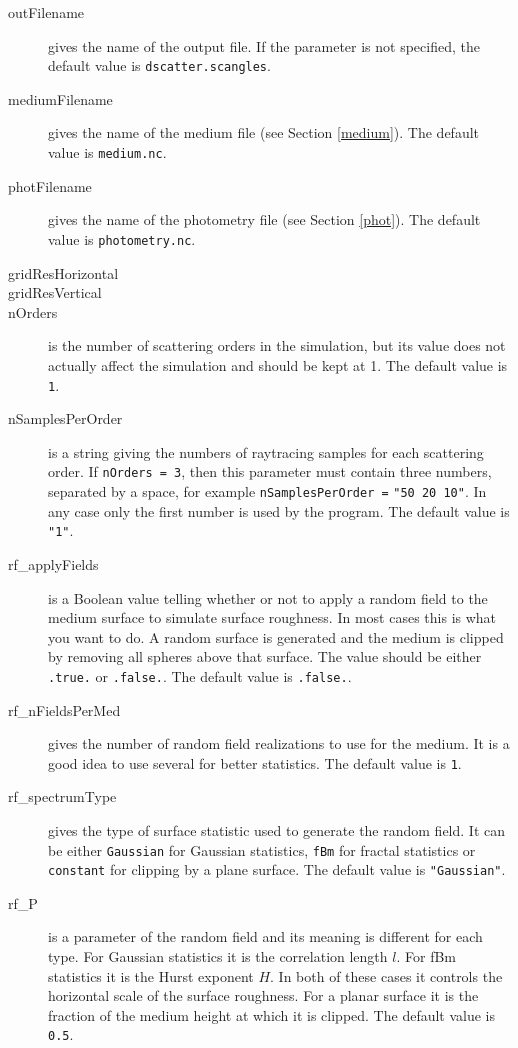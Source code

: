 \documentclass[a4paper]{article}
\newcommand{\code}[1]{\lstinline{#1}}
\begin{document}
\begin{description}
	\item[outFilename] gives the name of the output file. If the parameter is not specified, the default value is \code{dscatter.scangles}.
	\item[mediumFilename] gives the name of the medium file (see Section \ref{medium}). The default value is \code{medium.nc}.
	\item[photFilename] gives the name of the photometry file (see Section \ref{phot}). The default value is \code{photometry.nc}.
	\item[gridResHorizontal] %
	\item[gridResVertical] %
	\item[nOrders] is the number of scattering orders in the simulation, but its value does not actually affect the simulation and should be kept at 1. The default value is \code{1}.
	\item[nSamplesPerOrder] is a string giving the numbers of raytracing samples for each scattering order. If \code{nOrders = 3}, then this parameter must contain three numbers, separated by a space, for example \code{nSamplesPerOrder =} \code{"50 20 10"}. In any case only the first number is used by the program. The default value is \code{"1"}.
	\item[rf\_applyFields] is a Boolean value telling whether or not to apply a random field to the medium surface to simulate surface roughness. In most cases this is what you want to do. A random surface is generated and the medium is clipped by removing all spheres above that surface. The value should be either \code{.true.} or \code{.false.}. The default value is \code{.false.}.
	\item[rf\_nFieldsPerMed] gives the number of random field realizations to use for the medium. It is a good idea to use several for better statistics. The default value is \code{1}.
	\item[rf\_spectrumType] gives the type of surface statistic used to generate the random field. It can be either \code{Gaussian} for Gaussian statistics, \code{fBm} for fractal statistics or \code{constant} for clipping by a plane surface. The default value is \code{"Gaussian"}.
	\item[rf\_P] is a parameter of the random field and its meaning is different for each type. For Gaussian statistics it is the correlation length $l$. For fBm statistics it is the Hurst exponent $H$. In both of these cases it controls the horizontal scale of the surface roughness. For a planar surface it is the fraction of the medium height at which it is clipped. The default value is \code{0.5}. %

\end{description}
\end{document}
